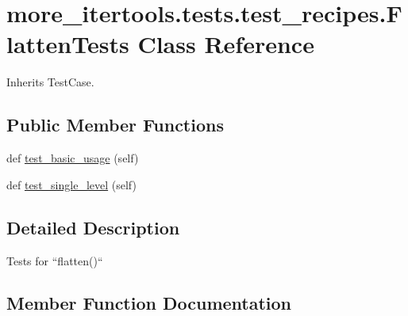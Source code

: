\hypertarget{classmore__itertools_1_1tests_1_1test__recipes_1_1_flatten_tests}{}\section{more\+\_\+itertools.\+tests.\+test\+\_\+recipes.\+Flatten\+Tests Class Reference}
\label{classmore__itertools_1_1tests_1_1test__recipes_1_1_flatten_tests}


Inherits Test\+Case.

\subsection*{Public Member Functions}
\begin{DoxyCompactItemize}
\item 
def \hyperlink{classmore__itertools_1_1tests_1_1test__recipes_1_1_flatten_tests_af764ac06a38cd4c595c504a97767e28f}{test\+\_\+basic\+\_\+usage} (self)
\item 
def \hyperlink{classmore__itertools_1_1tests_1_1test__recipes_1_1_flatten_tests_af3f32ac0369a3e52808b63b25d1bf8bd}{test\+\_\+single\+\_\+level} (self)
\end{DoxyCompactItemize}


\subsection{Detailed Description}
\begin{DoxyVerb}Tests for ``flatten()``\end{DoxyVerb}
 

\subsection{Member Function Documentation}
\mbox{\label{classmore__itertools_1_1tests_1_1test__recipes_1_1_flatten_tests_af764ac06a38cd4c595c504a97767e28f}} 
